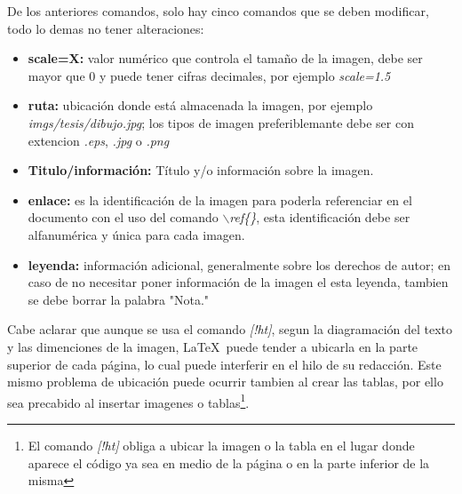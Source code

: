 De los anteriores comandos, solo hay cinco comandos que se deben modificar, todo lo demas no tener alteraciones:
\begin{itemize}
    \item \textbf{scale=X: } valor numérico que controla el tamaño de la imagen, debe ser mayor que 0 y puede tener cifras decimales, por ejemplo \emph{scale=1.5}
    \item \textbf{ruta: } ubicación donde está almacenada la imagen, por ejemplo \emph{imgs/tesis/dibujo.jpg}; los tipos de imagen preferiblemante debe ser con extencion \emph{.eps}, \emph{.jpg} o \emph{.png}
    \item \textbf{Titulo/información: } Título y/o información sobre la imagen.
    \item \textbf{enlace: } es la identificación de la imagen para poderla referenciar en el documento con el uso del comando $\backslash$\emph{ref\{\}}, esta identificación debe ser alfanumérica y única para cada imagen.
    \item \textbf{leyenda: } información adicional, generalmente sobre los derechos de autor; en caso de no necesitar poner información de la imagen el esta leyenda, tambien se debe borrar la palabra "Nota."
\end{itemize}

Cabe aclarar que aunque se usa el comando \emph{[!ht]}, segun la diagramación del texto y las dimenciones de la imagen, \LaTeX\ puede tender a ubicarla en la parte superior de cada página, lo cual puede interferir en el hilo de su redacción. Este mismo problema de ubicación puede ocurrir tambien al crear las tablas, por ello sea precabido al insertar imagenes o tablas\footnote{El comando \emph{[!ht]} obliga a ubicar la imagen o la tabla en el lugar donde aparece el código ya sea en medio de la página o en la parte inferior de la misma}.
